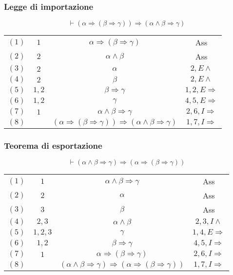 \subsubsection{Legge di importazione}
\begin{equation}
\vdash(\alpha\Rightarrow(\beta\Rightarrow\gamma))\Rightarrow(\alpha\land\beta\Rightarrow\gamma)
\end{equation}
\begin{tabular}{c c c c}
$(1)$& $1$ & $\alpha\Rightarrow(\beta\Rightarrow\gamma)$ & Ass\\
$(2)$& $2$ & $\alpha\land\beta$ & Ass\\
$(3)$ & $2$ & $\alpha$& $2, E\land$\\
$(4)$ & $2$ & $\beta$ & $2, E\land$\\
$(5)$ &$1, 2$ & $\beta\Rightarrow\gamma$ & $1,2,E\Rightarrow$\\
$(6)$ & $1, 2$ & $\gamma$ & $4, 5, E\Rightarrow$\\
$(7)$ & $1$ & $\alpha\land\beta\Rightarrow\gamma$ & $2, 6, I\Rightarrow$\\
$(8)$ & & $(\alpha\Rightarrow(\beta\Rightarrow\gamma))\Rightarrow(\alpha\land\beta\Rightarrow\gamma)$ & $1, 7, I\Rightarrow$
\end{tabular}
\subsubsection{Teorema di esportazione}
\begin{equation}
\vdash(\alpha\land\beta\Rightarrow\gamma)\Rightarrow(\alpha\Rightarrow(\beta\Rightarrow\gamma))
\end{equation}
\begin{tabular}{c c c c}
$(1)$& $1$ & $\alpha\land\beta\Rightarrow\gamma$ & Ass\\
$(2)$& $2$ & $\alpha$ & Ass\\
$(3)$ & $3$ & $\beta$& Ass\\
$(4)$ & $2, 3$ & $\alpha\land\beta$ & $2,3, I\land$\\
$(5)$ &$1, 2, 3$ & $\gamma$ & $1,4,E\Rightarrow$\\
$(6)$ & $1, 2$ & $\beta\Rightarrow\gamma$ & $4, 5, I\Rightarrow$\\
$(7)$ & $1$ & $\alpha\Rightarrow(\beta\Rightarrow\gamma)$ & $2, 6, I\Rightarrow$\\
$(8)$ & & $(\alpha\land\beta\Rightarrow\gamma)\Rightarrow(\alpha\Rightarrow(\beta\Rightarrow\gamma))$ & $1, 7, I\Rightarrow$
\end{tabular}
